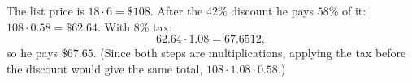 The list price is $18\cdot6=\$108$. After the $42\%$ discount he pays $58\%$ of it: $108\cdot0.58=\$62.64$. With $8\%$ tax:
\[
62.64\cdot1.08=67.6512,
\]
so he pays $\boxed{\$67.65}$. (Since both steps are multiplications, applying the tax before the discount would give the same total, $108\cdot1.08\cdot0.58$.)
